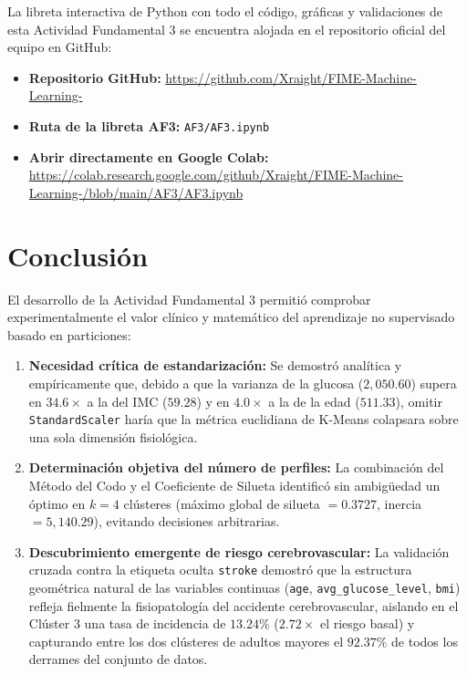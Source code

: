 La libreta interactiva de Python con todo el código, gráficas y validaciones de esta Actividad Fundamental 3 se encuentra alojada en el repositorio oficial del equipo en GitHub:
\begin{itemize}
    \item \textbf{Repositorio GitHub:} \url{https://github.com/Xraight/FIME-Machine-Learning-}
    \item \textbf{Ruta de la libreta AF3:} \texttt{AF3/AF3.ipynb}
    \item \textbf{Abrir directamente en Google Colab:} \url{https://colab.research.google.com/github/Xraight/FIME-Machine-Learning-/blob/main/AF3/AF3.ipynb}
\end{itemize}

\section{Conclusión}

El desarrollo de la Actividad Fundamental 3 permitió comprobar experimentalmente el valor clínico y matemático del aprendizaje no supervisado basado en particiones:
\begin{enumerate}
    \item \textbf{Necesidad crítica de estandarización:} Se demostró analítica y empíricamente que, debido a que la varianza de la glucosa ($2,050.60$) supera en $34.6\times$ a la del IMC ($59.28$) y en $4.0\times$ a la de la edad ($511.33$), omitir \texttt{StandardScaler} haría que la métrica euclidiana de K-Means colapsara sobre una sola dimensión fisiológica.
    \item \textbf{Determinación objetiva del número de perfiles:} La combinación del Método del Codo y el Coeficiente de Silueta identificó sin ambigüedad un óptimo en $k = 4$ clústeres (máximo global de silueta $= 0.3727$, inercia $= 5,140.29$), evitando decisiones arbitrarias.
    \item \textbf{Descubrimiento emergente de riesgo cerebrovascular:} La validación cruzada contra la etiqueta oculta \texttt{stroke} demostró que la estructura geométrica natural de las variables continuas (\texttt{age}, \texttt{avg\_glucose\_level}, \texttt{bmi}) refleja fielmente la fisiopatología del accidente cerebrovascular, aislando en el Clúster 3 una tasa de incidencia de $13.24\%$ ($2.72\times$ el riesgo basal) y capturando entre los dos clústeres de adultos mayores el $92.37\%$ de todos los derrames del conjunto de datos.
\end{enumerate}
